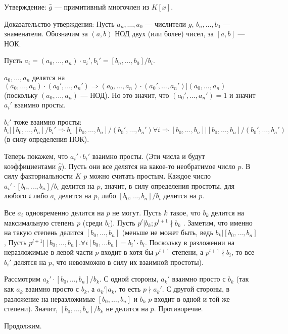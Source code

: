 \begin{solution}
Утверждение: \(\hat{g}\) --- примитивный многочлен из \(K[x]\).

Доказательство утверждения: Пусть \(a_n, \ldots, a_0\) --- числители \(g\), \(b_n, \ldots, b_0\) --- знаменатели. Обозначим за \((a, b)\) НОД двух (или более) чисел, за \([a, b]\) --- НОК.

Пусть \(a_i = (a_0, \ldots, a_n) \cdot a_i', b_i' = [b_n, \ldots, b_0] / b_i\).

\(a_0, \ldots, a_n\) делятся на
\((a_0, \ldots, a_n) \cdot (a_0', \ldots, a_n') \Rightarrow (a_0, \ldots, a_n) \cdot (a_0', \ldots, a_n') | (a_0, \ldots, a_n)\)
(поскольку \((a_0, \ldots, a_n)\) --- НОД). Но это значит, что
\((a_0', \ldots, a_n') = 1\) и значит \(a_i'\) взаимно просты.

\(b_i'\) тоже взаимно просты: \(b_i | [b_0, \ldots, b_n] / b_i' \Rightarrow b_i | [b_0, \ldots, b_n] / (b_0', \ldots, b_n') \forall i \Rightarrow [b_0, \ldots, b_n] | [b_0, \ldots, b_n] / (b_0', \ldots, b_n')\)
(в силу определения НОК).

Теперь покажем, что \(a_i' \cdot b_i'\) взаимно просты. (Эти числа и будут коэффициентами \(\hat{g}\)). Пусть они все делятся на какое-то необратимое число \(p\). В силу факториальности \(K\) \(p\) можно считать простым. Каждое число \(a_i' \cdot [b_0, \ldots, b_n] / b_i\) делится на \(p\), значит, в силу определения простоты, для любого \(i\) либо \(a_i\) делится на \(p\), либо \([b_0, \ldots, b_n] / b_i\) делится на \(p\).

Все \(a_i\) одновременно делится на \(p\) не могут. Пусть \(k\) такое, что \(b_k\) делится на максимальную степень \(p\) (среди \(b_i\)). Пусть \(p^l | b_k; p^{l + 1} \nmid b_k\) . Заметим, что именно на такую степень делится \([b_0, \ldots, b_n]\) (меньше не может быть, ведь \(b_k | [b_0, \ldots, b_n]\), Пусть \(p^{l + 1} | [b_0, \ldots, b_n]. \forall i [b_0, \ldots b_n] = b_i' \cdot b_i\). Поскольку в разложении на неразложимые в левой части \(p\) входит в хотя бы \(p^{l + 1}\) степени, а \(p^{l + 1} \nmid b_i\), то все \(b_i'\) делятся на \(p\), что невозможно в силу их взаимной простоты).

Рассмотрим \(a_k' \cdot [b_0, \ldots, b_n] / b_k\). С одной стороны, \(a_k'\) взаимно просто с \(b_k\) (так как \(a_k\) взаимно просто с \(b_k\), а \(a_k' | a_k\), то есть \(p \nmid a_k'\). С другой стороны, в разложение на неразложимые \([b_0, \ldots, b_n]\) и \(b_k\) \(p\) входит в одной и той же степени). Значит, \([b_0, \ldots, b_n] / b_k\) не делится на \(p\). Противоречие.

Продолжим.


\end{solution}
